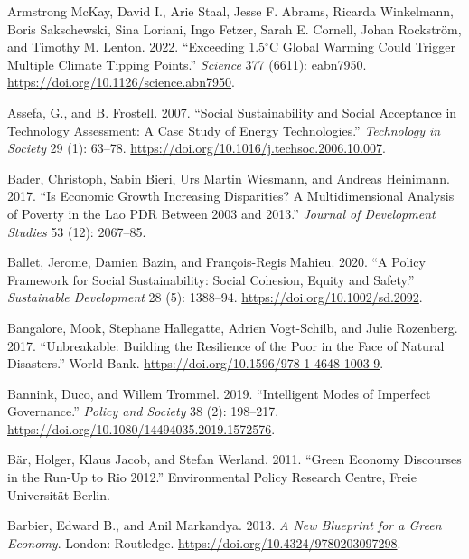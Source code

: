 \documentclass[
  a4paper,
  openany]{book}
\newlength{\cslhangindent}
\newenvironment{CSLReferences}[2] %
 {\begin{list}{}{%
  \setlength{\itemindent}{0pt}
  \setlength{\leftmargin}{0pt}
  \setlength{\parsep}{0pt}
  \ifodd #1
   \setlength{\leftmargin}{\cslhangindent}
   \setlength{\itemindent}{-1\cslhangindent}
  \fi
  \setlength{\itemsep}{#2\baselineskip}}}
 {\end{list}}
\begin{document}
\begin{CSLReferences}{1}{0}
Armstrong McKay, David I., Arie Staal, Jesse F. Abrams, Ricarda
Winkelmann, Boris Sakschewski, Sina Loriani, Ingo Fetzer, Sarah E.
Cornell, Johan Rockström, and Timothy M. Lenton. 2022. {``Exceeding
1.5{\(^\circ\)}{C} Global Warming Could Trigger Multiple Climate Tipping
Points.''} \emph{Science} 377 (6611): eabn7950.
\url{https://doi.org/10.1126/science.abn7950}.

Assefa, G., and B. Frostell. 2007. {``Social Sustainability and Social
Acceptance in Technology Assessment: {A} Case Study of Energy
Technologies.''} \emph{Technology in Society} 29 (1): 63--78.
\url{https://doi.org/10.1016/j.techsoc.2006.10.007}.

Bader, Christoph, Sabin Bieri, Urs Martin Wiesmann, and Andreas
Heinimann. 2017. {``Is Economic Growth Increasing Disparities? {A}
Multidimensional Analysis of Poverty in the {Lao PDR} Between 2003 and
2013.''} \emph{Journal of Development Studies} 53 (12): 2067--85.

Ballet, Jerome, Damien Bazin, and François-Regis Mahieu. 2020. {``A
Policy Framework for Social Sustainability: {Social} Cohesion, Equity
and Safety.''} \emph{Sustainable Development} 28 (5): 1388--94.
\url{https://doi.org/10.1002/sd.2092}.

Bangalore, Mook, Stephane Hallegatte, Adrien Vogt-Schilb, and Julie
Rozenberg. 2017. {``Unbreakable: {Building} the {Resilience} of the
{Poor} in the {Face} of {Natural Disasters}.''} World Bank.
\url{https://doi.org/10.1596/978-1-4648-1003-9}.

Bannink, Duco, and Willem Trommel. 2019. {``Intelligent Modes of
Imperfect Governance.''} \emph{Policy and Society} 38 (2): 198--217.
\url{https://doi.org/10.1080/14494035.2019.1572576}.

Bär, Holger, Klaus Jacob, and Stefan Werland. 2011. {``Green {Economy
Discourses} in the {Run-Up} to {Rio} 2012.''} Environmental Policy
Research Centre, Freie Universität Berlin.

Barbier, Edward B., and Anil Markandya. 2013. \emph{A {New Blueprint}
for a {Green Economy}}. London: Routledge.
\url{https://doi.org/10.4324/9780203097298}.


\end{CSLReferences}
\end{document}
